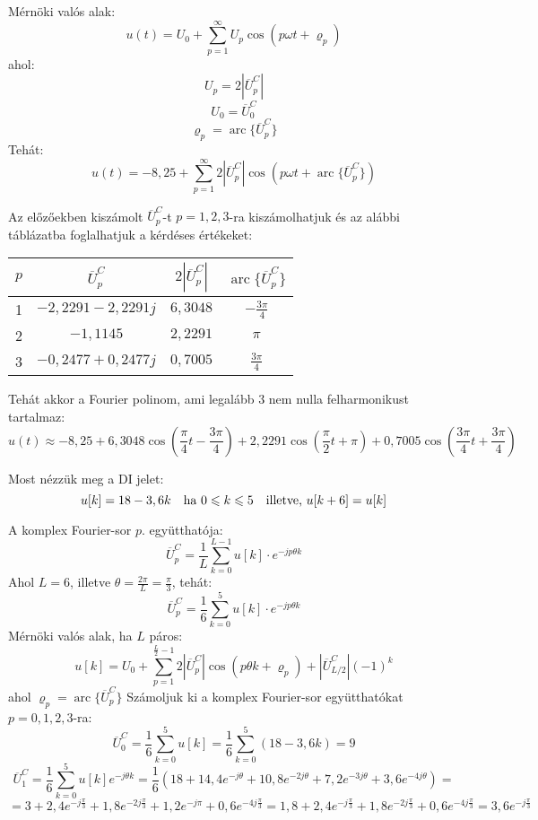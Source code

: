 \documentclass[12pt,a4paper]{article}
\DeclareMathOperator{\arc}{arc}
\begin{document}
Mérnöki valós alak:
\[u(t) = U_0 + \sum_{p=1}^{\infty} U_p \cos(p\omega t + \varrho_p)\]
ahol:
\[U_p = 2|\overline{U}^C_p|\]
\[U_0 = \overline{U}^C_0\]
\[\varrho_p = \arc\{\overline{U}^C_p\}\]
Tehát:
\[u(t) = -8,25 + \sum_{p=1}^{\infty} 2 |\overline{U}^C_p| \cos(p\omega t + \arc\{\overline{U}^C_p\})\]

Az előzőekben kiszámolt $\overline{U}^C_p$-t $p=1,2,3$-ra kiszámolhatjuk és az alábbi táblázatba foglalhatjuk a kérdéses értékeket:

\begin{center}
\begin{tabular}{|c|c|c|c|}
\hline
$p$ & $\overline{U}^C_p$ & $2|\overline{U}^C_p|$ & $\arc\{\overline{U}^C_p\}$ \\\hline\hline
1 & $-2,2291 - 2,2291j$ & $6,3048$ & $-\frac{3\pi}{4}$ \\\hline
2 & $-1,1145$ & $2,2291$ & $\pi$ \\\hline
3 & $-0,2477 + 0,2477j$ & $0,7005$ & $\frac{3\pi}{4}$ \\\hline
\end{tabular}
\end{center}

Tehát akkor a Fourier polinom, ami legalább 3 nem nulla felharmonikust tartalmaz:
\[u(t) \approx \boxed{-8,25 + 6,3048 \cos\left(\frac{\pi}{4} t -\frac{3\pi}{4}\right) + 2,2291 \cos\left(\frac{\pi}{2} t + \pi\right) + 0,7005 \cos\left(\frac{3\pi}{4} t + \frac{3\pi}{4}\right)}\]

Most nézzük meg a DI jelet:
\[u[k] = 18-3,6k \quad \hbox{ha } 0\leqslant k \leqslant 5 \quad \hbox{illetve, } u[k+6] = u[k]\]

A komplex Fourier-sor $p$. együtthatója:
\[\overline{U}^C_p = \frac{1}{L}\sum_{k=0}^{L-1} u[k]\cdot e^{-jp\theta k}\]
Ahol $L=6$, illetve $\theta = \frac{2\pi}{L} = \frac{\pi}{3}$, tehát:
\[\overline{U}^C_p = \frac{1}{6}\sum_{k=0}^{5} u[k]\cdot e^{-jp\theta k}\]
Mérnöki valós alak, ha $L$ páros:
\[u[k] = U_0  + \sum_{p=1}^{\frac{L}{2}-1} 2|\overline{U}^C_p|\cos(p\theta k + \varrho_p) + |\overline{U}^C_{L/2}|(-1)^k\]
ahol $\varrho_p = \arc\{\overline{U}^C_p\}$
Számoljuk ki a komplex Fourier-sor együtthatókat $p=0, 1, 2, 3$-ra:
\[\overline{U}^C_0 = \frac{1}{6}\sum_{k=0}^{5} u[k] = \frac{1}{6}\sum_{k=0}^{5} \left(18-3,6k\right) = 9\]
\[\overline{U}^C_1 = \frac{1}{6}\sum_{k=0}^{5} u[k] e^{-j\theta k} = \frac{1}{6}\left(  18+14,4e^{-j\theta}+10,8e^{-2j\theta}+7,2e^{-3j\theta}+3,6e^{-4j\theta}\right) = \]
\[= 3+2,4e^{-j\frac{\pi}{3}}+1,8e^{-2j\frac{\pi}{3}}+1,2e^{-j\pi}+0,6e^{-4j\frac{\pi}{3}} = 1,8+2,4e^{-j\frac{\pi}{3}}+1,8e^{-2j\frac{\pi}{3}}+0,6e^{-4j\frac{\pi}{3}} = \boxed{3,6e^{-j\frac{\pi}{3}}}\]
\end{document}

